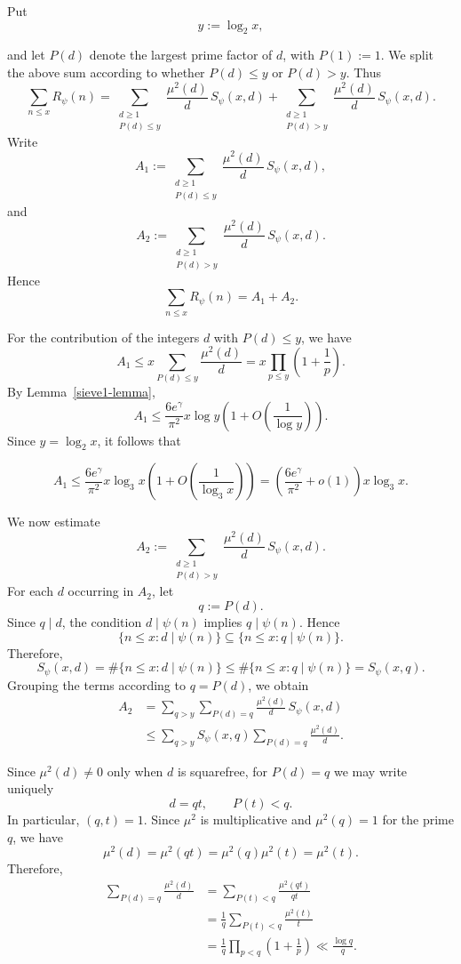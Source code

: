 \documentclass{article}
\theoremstyle{remark}
\begin{document}
Put
\[
y:=\log_2 x,
\]

and let \(P(d)\) denote the largest prime factor of \(d\), with
\(P(1):=1\). We split the above sum according to whether \(P(d)\le y\)
or \(P(d)>y\). Thus
\[
\sum_{n\le x}R_\psi(n)
=
\sum_{\substack{d\ge1\\P(d)\le y}}
\frac{\mu^2(d)}{d}\,S_\psi(x,d)
+
\sum_{\substack{d\ge1\\P(d)>y}}
\frac{\mu^2(d)}{d}\,S_\psi(x,d).
\]
Write
\[
A_1:=
\sum_{\substack{d\ge1\\P(d)\le y}}
\frac{\mu^2(d)}{d}\,S_\psi(x,d),
\]
and
\[
A_2:=
\sum_{\substack{d\ge1\\P(d)>y}}
\frac{\mu^2(d)}{d}\,S_\psi(x,d).
\]
Hence
\[
\sum_{n\le x}R_\psi(n)=A_1+A_2.
\]

For the contribution of the integers \(d\) with \(P(d)\le y\), we have
\[
A_1
\le
x\sum_{P(d)\le y}\frac{\mu^2(d)}d
=
x\prod_{p\le y}\left(1+\frac1p\right).
\]
By Lemma~\ref{sieve1-lemma},
\[
A_1
\le
\frac{6e^\gamma}{\pi^2}
x\log y
\left(1+O\left(\frac1{\log y}\right)\right).
\]
Since \(y=\log_2 x\), it follows that

\begin{equation}\label{A1}
A_1
\le
\frac{6e^\gamma}{\pi^2}
x\log_3 x
\left(1+O\left(\frac1{\log_3 x}\right)\right)
=
\left(\frac{6e^\gamma}{\pi^2}+o(1)\right)x\log_3 x.
\end{equation}

We now estimate
\[
A_2
:=
\sum_{\substack{d\ge1\\ P(d)>y}}
\frac{\mu^2(d)}{d}\,S_\psi(x,d).
\]
For each \(d\) occurring in \(A_2\), let
\[
q:=P(d).
\]
Since \(q\mid d\), the condition \(d\mid\psi(n)\) implies
\(q\mid\psi(n)\). Hence
\[
\{n\le x:d\mid\psi(n)\}
\subseteq
\{n\le x:q\mid\psi(n)\}.
\]
Therefore,
\[
S_\psi(x,d)
=
\#\{n\le x:d\mid\psi(n)\}
\le
\#\{n\le x:q\mid\psi(n)\}
=
S_\psi(x,q).
\]
Grouping the terms according to \(q=P(d)\), we obtain
\[
\begin{aligned}
A_2
&=
\sum_{q>y}
\sum_{P(d)=q}
\frac{\mu^2(d)}{d}\,S_\psi(x,d)\\
&\le
\sum_{q>y}
S_\psi(x,q)
\sum_{P(d)=q}
\frac{\mu^2(d)}{d}.
\end{aligned}
\]

Since $\mu^2(d)\neq0$ only when $d$ is squarefree, for $P(d)=q$
we may write uniquely
\[
d=qt,\qquad P(t)<q.
\]
In particular, $(q,t)=1$. Since $\mu^2$ is multiplicative and
$\mu^2(q)=1$ for the prime $q$, we have
\[
\mu^2(d)=\mu^2(qt)=\mu^2(q)\mu^2(t)=\mu^2(t).
\]
Therefore,
\[
\begin{aligned}
\sum_{P(d)=q}\frac{\mu^2(d)}{d}
&=
\sum_{P(t)<q}\frac{\mu^2(qt)}{qt}\\
&=
\frac1q\sum_{P(t)<q}\frac{\mu^2(t)}{t}\\
&
=\frac1q\prod_{p<q}\left(1+\frac1p\right)
\ll\frac{\log q}{q}.
\end{aligned}\]
\end{document}
